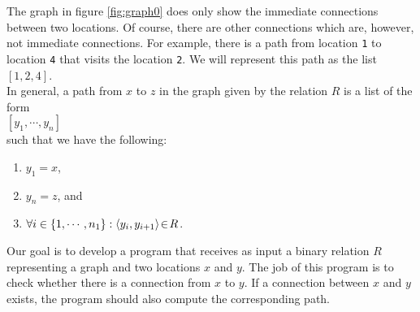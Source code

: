 \noindent
The graph in figure \ref{fig:graph0} does only show the immediate connections between two
locations.  Of course, there are other connections which are, however, not immediate
connections.  For example, there is a path from location 
\texttt{1} to location \texttt{4} that visits the location \texttt{2}. 
We will represent this path as the list
\\[0.2cm]
\hspace*{1.3cm}
$[1,2,4]$.
\\[0.2cm]
In general, a path from $x$ to $z$ in the graph given by the relation $R$ is a list of the form
\\[0.2cm]
\hspace*{1.3cm}
$[ y_1, \cdots, y_n ]$
\\[0.2cm]
such that we have the following:
\begin{enumerate}
\item $y_1 = x$,
\item $y_n = z$, \quad and
\item $\forall i \in \{ 1, \cdots, n_1 \}: \pair(y_i, y_{i+1}) \el R$.
\end{enumerate}
Our goal is to develop a program that receives as input a binary relation $R$ representing a graph and
two locations $x$ and $y$.  The job of this program is to check whether there is a
connection from $x$ to $y$.  If a connection between $x$ and $y$ exists, the program
should also compute the corresponding path.


